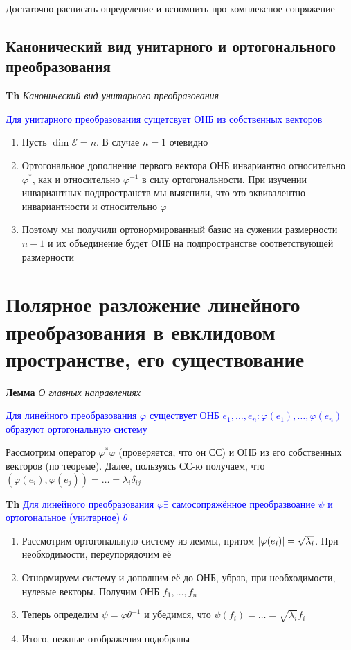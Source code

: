 \documentclass[a4paper, 14pt]{article}
\begin{document}
    Достаточно расписать определение и вспомнить про комплексное сопряжение
    
    \subsection{Канонический вид унитарного и ортогонального преобразования}
    
    \textbf{Th} \textit{Канонический вид унитарного преобразования}
    
    \textcolor{blue}{Для унитарного преобразования сущетсвует ОНБ из собственных векторов}
    
    \begin{enumerate}
        \item Пусть $\dim \mathscr{E} = n$.
        В случае $n = 1$ очевидно
        \item Ортогональное дополнение первого вектора ОНБ инвариантно относительно $\varphi^*$, как и относительно $\varphi^{-1}$ в
        силу ортогональности.
        При изучении инвариантных подпространств мы выяснили, что это эквивалентно инвариантности и относительно $\varphi$
        \item Поэтому мы получили ортонормированный базис на сужении размерности $n - 1$ и их объединение будет ОНБ на
        подпространстве соответствующей размерности
    \end{enumerate}
    
    \section{Полярное разложение линейного преобразования в евклидовом пространстве, его существование}
    
    \textbf{Лемма} \textit{О главных направлениях}
    
    \textcolor{blue}{Для линейного преобразования $\varphi$ существует
    ОНБ $e_1, \dots, e_n: \varphi(e_1), \dots, \varphi(e_n)$ образуют ортогональную систему}
    
    Рассмотрим оператор $\varphi^* \varphi$ (проверяется, что он СС) и ОНБ из его собственных векторов (по теореме).
    Далее, пользуясь СС-ю получаем, что $(\varphi(e_i), \varphi(e_j)) = \dots = \lambda_i \delta_{ij}$
    
    \textbf{Th} \textcolor{blue}{Для линейного преобразования $\varphi \exists$ самосопряжённое
    преобразвоание $\psi$ и ортогональное (унитарное) $\theta$}
    
    \begin{enumerate}
        \item Рассмотрим ортогональную систему из леммы, притом $\abs{\varphi(e_i)} = \sqrt{\lambda_i}$.
        При необходимости, переупорядочим её
        \item Отнормируем систему и дополним её до ОНБ, убрав, при необходимости, нулевые векторы.
        Получим ОНБ $f_1, \dots, f_n$
        \item Теперь определим $\psi = \varphi \theta^{-1}$ и убедимся, что $\psi(f_i) = \dots = \sqrt{\lambda_i} f_i$
        \item Итого, нежные отображения подобраны
    \end{enumerate}
    
\end{document}

